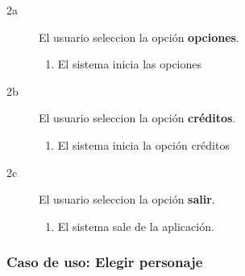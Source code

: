\begin{description}
\begin{description}
            \item[2a ] El usuario seleccion la opción \textbf{opciones}.
            \begin{enumerate}
                \item El sistema inicia las opciones
            \end{enumerate}
            
            \item[2b ] El usuario seleccion la opción \textbf{créditos}.
            \begin{enumerate}
                \item El sistema inicia la opción créditos
            \end{enumerate}
            
            \item[2c ] El usuario seleccion la opción \textbf{salir}.
            \begin{enumerate}
                \item El sistema sale de la aplicación.
            \end{enumerate}
            
        \end{description}
\end{description}

\subsubsection{Caso de uso: Elegir personaje}

